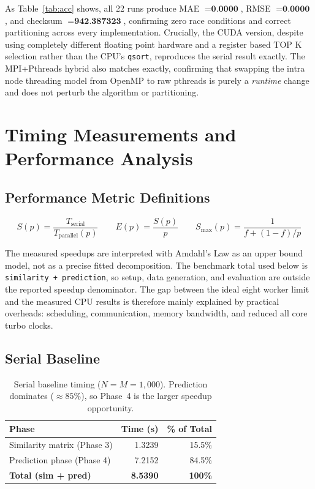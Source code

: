 \documentclass[11pt,a4paper]{article}
\newcommand{\code}[1]{\texttt{\small #1}}
\begin{document}
As Table~\ref{tab:acc} shows, all 22 runs produce MAE
$=\textbf{0.0000}$, RMSE $=\textbf{0.0000}$, and checksum
$=\textbf{942.387323}$, confirming zero race conditions and correct
partitioning across every implementation. Crucially, the CUDA version, despite
using completely different floating point hardware and a register based TOP K
selection rather than the CPU's \code{qsort}, reproduces the serial result
exactly. The MPI+Pthreads hybrid also matches exactly, confirming that swapping
the intra node threading model from OpenMP to raw pthreads is purely a
\emph{runtime} change and does not perturb the algorithm or partitioning.


\section{Timing Measurements and Performance Analysis}\label{sec:timing}

\subsection{Performance Metric Definitions}

\[
  S(p) = \frac{T_{\text{serial}}}{T_{\text{parallel}}(p)}
  \qquad
  E(p) = \frac{S(p)}{p}
  \qquad
  S_{\max}(p) = \frac{1}{f + (1-f)/p}
\]

The measured speedups are interpreted with Amdahl's Law as an upper bound model,
not as a precise fitted decomposition. The benchmark total used below is
\code{similarity + prediction}, so setup, data generation, and evaluation are
outside the reported speedup denominator. The gap between the ideal eight worker
limit and the measured CPU results is therefore mainly explained by practical
overheads: scheduling, communication, memory bandwidth, and reduced all core
turbo clocks.

\subsection{Serial Baseline}

\begin{table}[!htbp]
\centering
\begin{tabular}{lrr}
\toprule
\textbf{Phase} & \textbf{Time (s)} & \textbf{\% of Total} \\
\midrule
Similarity matrix (Phase 3) & 1.3239 & 15.5\% \\
Prediction phase (Phase 4)  & 7.2152 & 84.5\% \\
\textbf{Total (sim + pred)} & \textbf{8.5390} & \textbf{100\%} \\
\bottomrule
\end{tabular}
\caption{Serial baseline timing ($N=M=1{,}000$). Prediction dominates ($\approx 85\%$), so Phase~4 is the larger speedup opportunity.}
\end{table}
\end{document}
